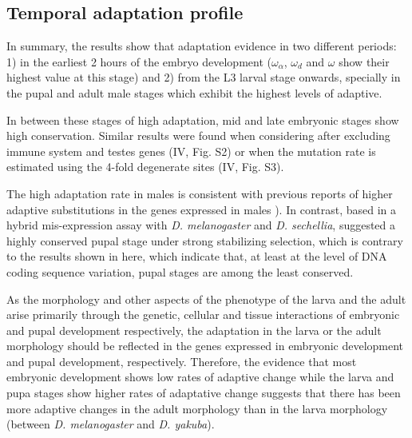 
\subsection{Temporal adaptation profile}

In summary, the results show that adaptation evidence in two different periods: 
1) in the earliest 2 hours of the embryo development ($\omega_{\alpha}$, $\omega_{d}$ and $\omega$ show their highest value at this stage) and 
2) from the L3 larval stage onwards, specially in the pupal and adult male stages which exhibit the highest levels of adaptive.

In between these stages of high adaptation, mid and late embryonic stages show high conservation. 
Similar results were found when considering after excluding immune system and testes genes (IV, Fig. S2) or when the mutation rate is estimated using the 4-fold degenerate sites (IV, Fig. S3).

The high adaptation rate in males is consistent with previous reports of higher adaptive substitutions in the genes expressed in males \citealp{Proschel2006,Haerty2007}). 
In contrast, based in a hybrid mis-expression assay with \textit{D. melanogaster} and \textit{D. sechellia}, \citet{Artieri2010} suggested a highly conserved pupal stage under strong stabilizing selection, which is contrary to the results shown in here, which indicate that, at least at the level of DNA coding sequence variation, pupal stages are among the least conserved.

As the morphology and other aspects of the phenotype of the larva and the adult arise primarily through the genetic, cellular and tissue interactions of embryonic and pupal development respectively, the adaptation in the larva or the adult morphology should be reflected in the genes expressed in embryonic development and pupal development, respectively.
Therefore, the evidence that most embryonic development shows low rates of adaptive change while the larva and pupa stages show higher rates of adaptative change suggests that there has been more adaptive changes in the adult morphology than in the larva morphology (between \textit{D. melanogaster} and \textit{D. yakuba}).

